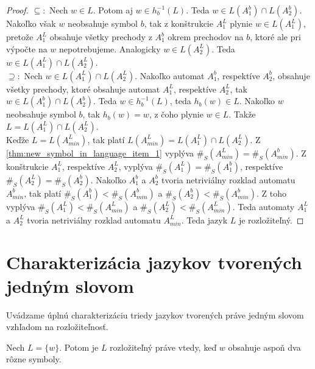 \begin{proof}
$ \subseteq: $ Nech $ w \in L $. Potom aj $ w \in h_b^{-1}(L) $. Teda $ w \in L(A_1^b) \cap L(A_2^b) $. Nakoľko však $ w $ neobsahuje symbol $ b $, tak z konštrukcie $ A_1^L $ plynie $ w \in L(A_1^L) $, pretože $ A_1^L $ obsahuje všetky prechody z $ A_1^b $ okrem prechodov na $ b $, ktoré ale pri výpočte na  $ w $ nepotrebujeme. Analogicky $ w \in L(A_2^L) $. Teda $ w \in L(A_1^L) \cap L(A_2^L) $. \\
$ \supseteq: $ Nech $ w \in L(A_1^L) \cap L(A_2^L) $. Nakoľko automat $ A_1^b $, respektíve $ A_2^b $, obsahuje všetky prechody, ktoré obsahuje automat $ A_1^L $, respektíve $ A_2^L $, tak $ w \in L(A_1^b) \cap L(A_2^b) $. Teda $ w \in h_b^{-1}(L) $, teda $ h_b(w) \in L $. Nakoľko $ w $ neobsahuje symbol $ b $, tak $ h_b(w) = w $, z čoho plynie $ w \in L $. Takže  $ L = L(A_1^L) \cap L(A_2^L) $. \\
Keďže $ L = L(A^L_{min}) $, tak platí $ L(A^L_{min}) = L(A_1^L) \cap L(A_2^L) $. Z \ref{thm:new_symbol_in_language_item_1} vyplýva $ \#_S(A^L_{min}) = \#_S(A^b_{min}) $. Z konštrukcie $ A_1^L $, respektíve $ A_2^L $, vyplýva $ \#_S(A_1^L)=\#_S(A_1^b) $, respektíve $ \#_S(A_2^L)=\#_S(A_2^b) $. Nakoľko $ A_1^b $ a $ A_2^b $ tvoria netriviálny rozklad automatu $ A^b_{min} $, tak platí $ \#_S(A_1^b) < \#_S(A^b_{min}) $ a $ \#_S(A_2^b) < \#_S(A^b_{min}) $. Z toho vyplýva $ \#_S(A_1^L) < \#_S(A^L_{min}) $ a $ \#_S(A_2^L) < \#_S(A^L_{min}) $. Teda automaty $  A_1^L $ a $ A_2^L $ tvoria netriviálny rozklad automatu $ A^L_{min} $. Teda jazyk $ L $ je rozložiteľný.
\end{proof}

\section{Charakterizácia jazykov tvorených jedným slovom}
Uvádzame úplnú charakterizáciu triedy jazykov tvorených práve jedným slovom vzhľadom na rozložiteľnosť.

\begin{theorem}
\label{thm:singleton_characterization}
Nech $ L = \lbrace w \rbrace $. Potom je $ L $ rozložiteľný práve vtedy, keď $ w $ obsahuje aspoň dva rôzne symboly.
\end{theorem}

